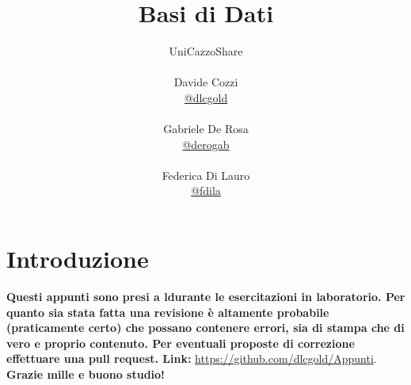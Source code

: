 \documentclass[a4paper,12pt, oneside]{book}
\title{Basi di Dati}
\author{UniCazzoShare\\\\Davide Cozzi\\\href{https://t.me/dlcgold}{@dlcgold}\\\\Gabriele De Rosa\\\href{https://t.me/derogab}{@derogab} \\\\Federica Di Lauro\\\href{https://t.me/f_dila}{@f\textunderscore dila}}
\date{}
\begin{document}
\maketitle


\newtheorem{teorema}{Teorema}
\newtheorem{definizione}{Definizione}
\newtheorem{esempio}{Esempio}
\newtheorem{corollario}{Corollario}
\newtheorem{lemma}{Lemma}
\newtheorem{osservazione}{Osservazione}
\newtheorem{nota}{Nota}
\newtheorem{esercizio}{Esercizio}
\tableofcontents
\renewcommand{\chaptermark}[1]{%
\markboth{\chaptername
\ \thechapter.\ #1}{}}
\renewcommand{\sectionmark}[1]{\markright{\thesection.\ #1}}
\chapter{Introduzione}
\textbf{Questi appunti sono presi a ldurante le esercitazioni in laboratorio. Per quanto sia stata fatta una revisione è altamente probabile (praticamente certo) che possano contenere errori, sia di stampa che di vero e proprio contenuto. Per eventuali proposte di correzione effettuare una pull request. Link: } \url{https://github.com/dlcgold/Appunti}.\\
\textbf{Grazie mille e buono studio!}
\end{document}

